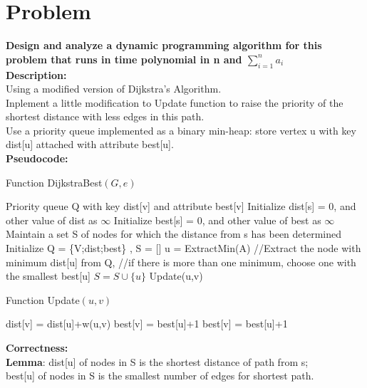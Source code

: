 \documentclass{article}
\begin{document}
\clearpage 
\section{Problem \uppercase\expandafter{}}
\textbf{Design and analyze a dynamic programming algorithm for this problem that runs in time polynomial in n and $\sum_{i=1}^n a_i$}\\
\textbf{\large Description:\\}
Using a modified version of Dijkstra's Algorithm.\\
Inplement a little modification to Update function to raise the priority of the shortest distance with less edges in this path.\\
Use a priority queue implemented as a binary min-heap: store vertex u with key dist[u] attached with attribute best[u].\\
\textbf{\large Pseudocode:\\}
\begin{algorithm}[H]
  \caption{Function DijkstraBest$(G,e)$}
  \label{alg1}
  \begin{algorithmic}
  \STATE Priority queue Q with key dist[v] and attribute best[v]
  \STATE Initialize dist[s] = 0, and other value of dist as $\infty$
  \STATE Initialize best[s] = 0, and other value of best as $\infty$
  \STATE Maintain a set S of nodes for which the distance from s has been determined
  \STATE Initialize Q = \{V;dist;best\} , S = []
  \STATE u = ExtractMin(A) 
  \STATE //Extract the node with minimum dist[u] from Q,
  \STATE //if there is more than one minimum, choose one with the smallest best[u]
  \STATE $S = S \cup \{ u\}$
  \STATE Update(u,v)
  \ENDFOR
  \ENDFOR 
  \end{algorithmic}
\end{algorithm}
\begin{algorithm}[H]
  \caption{Function Update$(u,v)$}
  \label{alg1}
  \begin{algorithmic}
  \STATE dist[v] = dist[u]+w(u,v)
  \STATE best[v] = best[u]+1
  \STATE best[v] = best[u]+1
  \ENDIF 
  \ENDIF
  \end{algorithmic}
\end{algorithm}
\noindent\textbf{\large Correctness:\\}
\textbf{Lemma}: dist[u] of nodes in S is the shortest distance of path from s;\\
best[u] of nodes in S is the smallest number of edges for shortest path.\\
\end{document}
